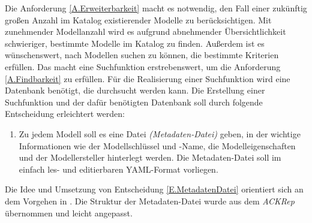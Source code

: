 Die Anforderung \ref{A.Erweiterbarkeit} macht es notwendig, den Fall einer zukünftig großen Anzahl im Katalog existierender Modelle zu berücksichtigen. Mit zunehmender Modellanzahl wird es aufgrund abnehmender Übersichtlichkeit schwieriger, bestimmte Modelle im Katalog zu finden. Außerdem ist es wünschenswert, nach Modellen suchen zu können, die bestimmte Kriterien erfüllen. Das macht eine Suchfunktion erstrebenswert,  um die Anforderung \ref{A.Findbarkeit} zu erfüllen. Für die Realisierung einer Suchfunktion wird eine Datenbank benötigt, die durchsucht werden kann. Die Erstellung einer Suchfunktion und der dafür benötigten Datenbank soll durch folgende Entscheidung erleichtert werden:
\begin{enumerate}[label=\textbf{Entscheidung E.\arabic*}:, ref=\textbf{E.\arabic*}, wide=0pt, leftmargin=*]
	\item \label{E.MetadatenDatei}Zu jedem Modell soll es eine Datei \textit{(Metadaten-Datei)} geben, in der wichtige Informationen wie der Modellschlüssel und -Name, die Modelleigenschaften und der Modellersteller hinterlegt werden. Die Metadaten-Datei soll im einfach les- und editierbaren YAML-Format vorliegen.
\end{enumerate}
Die Idee und Umsetzung von Entscheidung \ref{E.MetadatenDatei} orientiert sich an dem Vorgehen in \cite{KNHE20a}. Die Struktur der Metadaten-Datei wurde aus dem \textit{ACKRep} übernommen und leicht angepasst.

